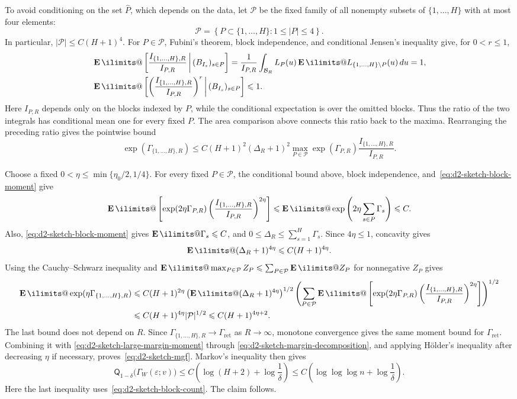 \documentclass[11pt, letterpaper, hidelinks]{article}
\makeatletter
\renewcommand{\proofname}{\textit{\textbf{Proof}}}
\renewenvironment{proof}[1][\proofname]{\par\pushQED{\qed}\normalfont \topsep6\p@\@plus6\p@\relax\trivlist\item[\hskip\labelsep#1\@addpunct{}]\ignorespaces}{\popQED\endtrivlist\@endpefalse}
\newcommand{\proofsketchname}{\textit{\textbf{Proof sketch}}}
\newenvironment{proofsketch}
  {\begin{proof}[\proofsketchname]}
  {\end{proof}}
\newcommand{\1}{\mathbf 1}
\newcommand{\eps}{\varepsilon}
\let\subseteq\subset
\renewcommand{\leq}{\leqslant}
\newcommand{\E}{\operatorname*{\mathbf{E}}\ilimits@}
\theoremstyle{plain}
\theoremstyle{definition}
\newcommand{\Quant}[1]{\mathsf{Q}_{#1}}
\makeatother
\begin{document}
\begin{proofsketch}
To avoid conditioning on the set $\widehat P$, which depends on the data, let
$\mathcal P$ be the fixed family of all nonempty subsets of
$\{1,\ldots,H\}$ with at most four elements:
\[
\mathcal P
=\left\{P\subseteq\{1,\ldots,H\}:1\leq|P|\leq4\right\}.
\]
In particular, $|\mathcal P|\leq C(H+1)^4$.  For $P\in\mathcal P$, Fubini's
theorem, block independence, and conditional Jensen's inequality give, for
$0<r\leq1$,
\[
\begin{aligned}
&\E\left[\frac{I_{\{1,\ldots,H\},R}}{I_{P,R}}
\,\middle|\,(B_{I_s})_{s\in P}\right]
=\frac{1}{I_{P,R}}\int_{\mathcal B_R}L_P(u)
\E L_{\{1,\ldots,H\}\setminus P}(u)\,du =1,\\
&\E\left[\left(\frac{I_{\{1,\ldots,H\},R}}{I_{P,R}}\right)^r
\,\middle|\,(B_{I_s})_{s\in P}\right]\leq1.
\end{aligned}
\]
Here $I_{P,R}$ depends only on the blocks indexed by $P$, while the conditional
expectation is over the omitted blocks.  Thus the ratio of the two integrals
has conditional mean one for every fixed $P$.  The area comparison above connects this ratio back
to the maxima.  Rearranging the
preceding ratio gives the pointwise bound
\[
\exp(\Gamma_{\{1,\ldots,H\},R})
\leq C(H+1)^2(\Delta_R+1)^2
\max_{P\in\mathcal P}\exp(\Gamma_{P,R})
\frac{I_{\{1,\ldots,H\},R}}{I_{P,R}}.
\]

Choose a fixed $0<\eta\leq\min\{\eta_0/2,1/4\}$.
For every fixed $P\in\mathcal P$, the conditional bound above, block
independence, and~\eqref{eq:d2-sketch-block-moment} give
\[
\E\left[\exp(2\eta\Gamma_{P,R})
\left(\frac{I_{\{1,\ldots,H\},R}}{I_{P,R}}\right)^{2\eta}\right]
\leq\E\exp\left(2\eta\sum_{s\in P}\Gamma_s\right)
\leq C.
\]
Also, \eqref{eq:d2-sketch-block-moment} gives $\E\Gamma_s\leq C$, and
$0\leq\Delta_R\leq\sum_{s=1}^H\Gamma_s$.  Since $4\eta\leq1$, concavity gives
\[
\E(\Delta_R+1)^{4\eta}\leq C(H+1)^{4\eta}.
\]
Using the Cauchy--Schwarz inequality and
$\E\max_{P\in\mathcal P}Z_P\leq\sum_{P\in\mathcal P}\E Z_P$ for
nonnegative $Z_P$ gives
\[
\begin{aligned}
\E\exp(\eta\Gamma_{\{1,\ldots,H\},R})
&\leq C(H+1)^{2\eta}
\left(\E(\Delta_R+1)^{4\eta}\right)^{1/2}
\left(\sum_{P\in\mathcal P}
\E\left[\exp(2\eta\Gamma_{P,R})
\left(\frac{I_{\{1,\ldots,H\},R}}{I_{P,R}}\right)^{2\eta}\right]\right)^{1/2}\\
&\leq C(H+1)^{4\eta}|\mathcal P|^{1/2}
\leq C(H+1)^{4\eta+2}.
\end{aligned}
\]
The last bound does not depend on $R$.  Since
$\Gamma_{\{1,\ldots,H\},R}\to\Gamma_{\mathrm{ret}}$ as $R\to\infty$,
monotone convergence gives the same moment bound for
$\Gamma_{\mathrm{ret}}$.  Combining it with
\eqref{eq:d2-sketch-large-margin-moment} through
\eqref{eq:d2-sketch-margin-decomposition}, and applying H\"older's inequality
after decreasing $\eta$ if necessary, proves~\eqref{eq:d2-sketch-mgf}.
Markov's inequality then gives
\[
\Quant{1-\delta}\bigl(\Gamma_W(\eps;v)\bigr)
\leq C\left(\log(H+2)+\log\frac1\delta\right)
\leq C\left(\log\log\log n+\log\frac1\delta\right).
\]
Here the last inequality uses~\eqref{eq:d2-sketch-block-count}.
The claim follows.
\end{proofsketch}
\end{document}
